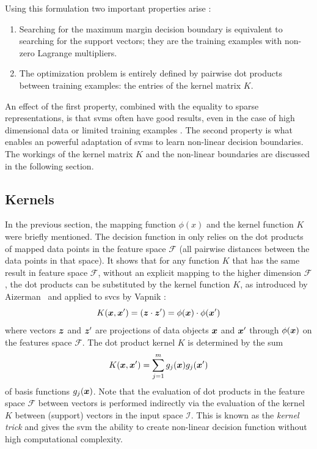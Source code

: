 Using this formulation two important properties arise \cite{flach2012machine}:
\begin{enumerate}
  \item Searching for the maximum margin decision boundary is equivalent to searching for the support vectors; they are the training examples with non-zero Lagrange multipliers.
  \item The optimization problem is entirely defined by pairwise dot products between training examples: the entries of the kernel matrix $K$.
\end{enumerate}
An effect of the first property, combined with the equality to sparse representations, is that \glspl{svm} often have good results, even in the case of high dimensional data or limited training examples \cite{cherkassky2007learning}.
The second property is what enables an powerful adaptation of \glspl{svm} to learn non-linear decision boundaries.
The workings of the kernel matrix $K$ and the non-linear boundaries are discussed in the following section.


\subsection{Kernels}\label{subsec:kernels}
In the previous section, the mapping function $\phi(x)$ and the kernel function $K$ were briefly mentioned.
The decision function in  only relies on the dot products of mapped data points in the feature space $\mathcal{F}$ (\ie all pairwise distances between the data points in that space).
It shows \cite{flach2012machine} that for any function $K$ that has the same result in feature space $\mathcal{F}$, without an explicit mapping to the higher dimension $\mathcal{F}$, the dot products can be substituted by the kernel function $K$, as introduced by Aizerman~\etal \cite{aizerman1964theoretical} and applied to \glspl{svc} by Vapnik \cite{vapnik1998statistical}:
\begin{equation}
  K(\vectorsym{x}, \vectorsym{x}') = (\vectorsym{z} \cdot \vectorsym{z}') = \phi(\vectorsym{x}) \cdot \phi(\vectorsym{x}')
\end{equation}
where vectors $\vectorsym{z}$ and $\vectorsym{z}'$ are projections of data objects $\vectorsym{x}$ and $\vectorsym{x}'$ through $\phi(\vectorsym{x})$ on the features space $\mathcal{F}$.
The dot product kernel $K$ is determined by the sum
\begin{equation}
  K(\vectorsym{x}, \vectorsym{x}') = \sum_{j=1}^m g_j(\vectorsym{x}) g_j(\vectorsym{x}')
\end{equation}
of basis functions $g_j(\vectorsym{x})$.
Note that the evaluation of dot products in the feature space $\mathcal{F}$ between vectors is performed indirectly via the evaluation of the kernel $K$ between (support) vectors in the input space $\mathcal{I}$.
This is known as the \emph{kernel trick} and gives the \gls{svm} the ability to create non-linear decision function without high computational complexity.

